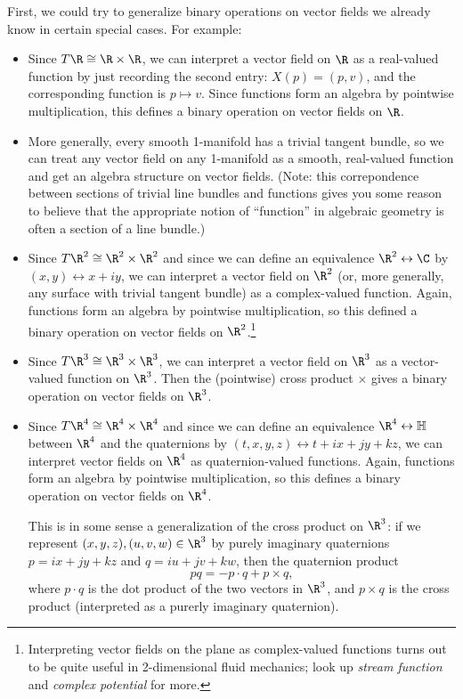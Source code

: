 First, we could try to generalize binary operations on vector fields we already know in certain special cases. For example:
\begin{itemize}
	\item Since $T\R \cong \R \times \R$, we can interpret a vector field on $\R$ as a real-valued function by just recording the second entry: $X(p) = (p,v)$, and the corresponding function is $p \mapsto v$. Since functions form an algebra by pointwise multiplication, this defines a binary operation on vector fields on $\R$.
	
	\item More generally, every smooth 1-manifold has a trivial tangent bundle, so we can treat any vector field on any 1-manifold as a smooth, real-valued function and get an algebra structure on vector fields. (Note: this correpondence between sections of trivial line bundles and functions gives you some reason to believe that the appropriate notion of ``function'' in algebraic geometry is often a section of a line bundle.)
	
	\item Since $T \R^2 \cong \R^2 \times \R^2$ and since we can define an equivalence $\R^2 \leftrightarrow \C$ by $(x,y) \leftrightarrow x + iy$, we can interpret a vector field on $\R^2$ (or, more generally, any surface with trivial tangent bundle) as a complex-valued function. Again, functions form an algebra by pointwise multiplication, so this defined a binary operation on vector fields on $\R^2$.\footnote{Interpreting vector fields on the plane as complex-valued functions turns out to be quite useful in 2-dimensional fluid mechanics; look up \emph{stream function} and \emph{complex potential} for more.}
	
	\item Since $T\R^3 \cong \R^3 \times \R^3$, we can interpret a vector field on $\R^3$ as a vector-valued function on $\R^3$. Then the (pointwise) cross product $\times$ gives a binary operation on vector fields on $\R^3$.
	
	\item Since $T\R^4 \cong \R^4 \times \R^4$ and since we can define an equivalence $\R^4 \leftrightarrow \mathbb{H}$ between $\R^4$ and the quaternions by $(t,x,y,z) \leftrightarrow t +i x + j y + kz$, we can interpret vector fields on $\R^4$ as quaternion-valued functions. Again, functions form an algebra by pointwise multiplication, so this defines a binary operation on vector fields on $\R^4$. 
	
	This is in some sense a generalization of the cross product on $\R^3$: if we represent $(x,y,z),(u,v,w) \in \R^3$ by purely imaginary quaternions $p = ix + jy + kz$ and $q = iu + jv + kw$, then the quaternion product
	\[
		pq = -p \cdot q + p \times q,
	\]
	where $p \cdot q$ is the dot product of the two vectors in $\R^3$, and $p \times q$ is the cross product (interpreted as a purerly imaginary quaternion). 
\end{itemize}

